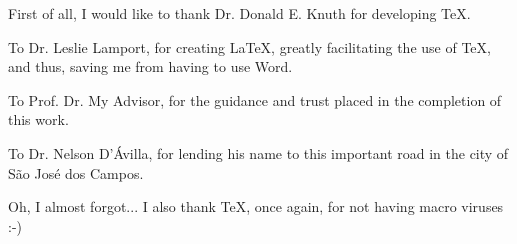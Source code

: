 First of all, I would like to thank Dr. Donald E. Knuth for developing \TeX.

To Dr. Leslie Lamport, for creating \LaTeX, greatly facilitating the use of \TeX, and thus, saving me from having to use Word.

To Prof. Dr. My Advisor, for the guidance and trust placed in the completion of this work.

To Dr. Nelson D'Ávilla, for lending his name to this important road in the city of São José dos Campos.

Oh, I almost forgot... I also thank \TeX, once again, for not having macro viruses :-)

